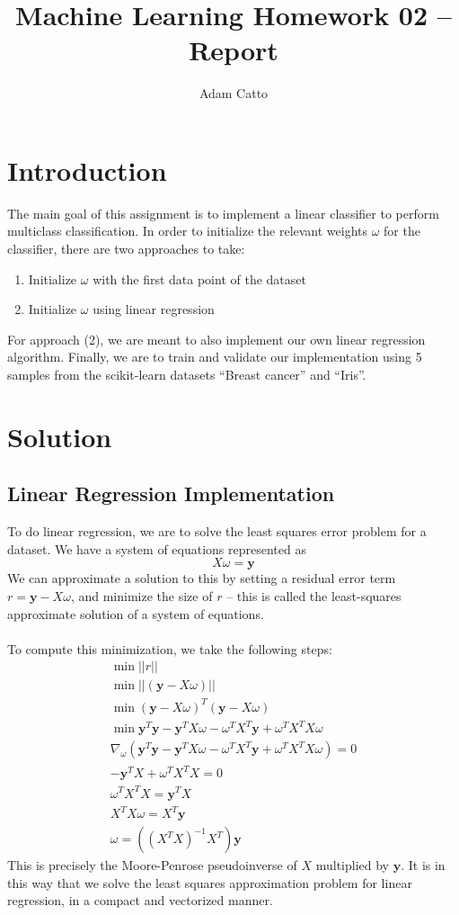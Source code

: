 \documentclass[11pt]{article}
\title{Machine Learning Homework 02 – Report}
\author{Adam Catto}
\date{ }
\newcommand{\y}{\mathbf{y}}
\begin{document}
\maketitle
\section{Introduction}
The main goal of this assignment is to implement a linear classifier to perform multiclass classification. In order to initialize the relevant weights $\omega$ for the classifier, there are two approaches to take: 
\begin{enumerate}
	\item Initialize $\omega$ with the first data point of the dataset
	\item Initialize $\omega$ using linear regression
\end{enumerate}
For approach (2), we are meant to also implement our own linear regression algorithm. Finally, we are to train and validate our implementation using 5 samples from the scikit-learn datasets ``Breast cancer'' and ``Iris''.

\section{Solution}

\subsection{Linear Regression Implementation}
To do linear regression, we are to solve the least squares error problem for a dataset. We have a system of equations represented as 
$$ X\omega = \mathbf{y}$$We can approximate a solution to this by setting a residual error term $r = \mathbf{y} - X\omega $, and minimize the size of $r$ – this is called the least-squares approximate solution of a system of equations.\\ 
 \\
To compute this minimization, we take the following steps:
\begin{gather}
	\min ||r||\\ 
	\min ||(\mathbf{y} - X\omega)|| \\
	\min (\mathbf{y} - X\omega)^T (\mathbf{y} - X\omega) \\
	\min \mathbf{y}^T\mathbf{y} - \mathbf{y}^T X\omega - \omega^T X^T \mathbf{y} + 
	\omega^T X^T X \omega  \\
		\nabla _{\omega} \left( \mathbf{y}^T\mathbf{y} - \mathbf{y}^T X\omega - \omega^T X^T \mathbf{y} + 	\omega^T X^T X \omega  \right) = 0\\
		- \y^T X + \omega^T X^T X = 0\\
		\omega^T X^T X = \y^T X		\\
		X^T X \omega = X^T \y \\
		\omega = ((X^T X)^{-1}X^T)\y
\end{gather}
This is precisely the Moore-Penrose pseudoinverse of $X$ multiplied by $\y$. It is in this way that we solve the least squares approximation problem for linear regression, in a compact and vectorized manner.
\end{document}
